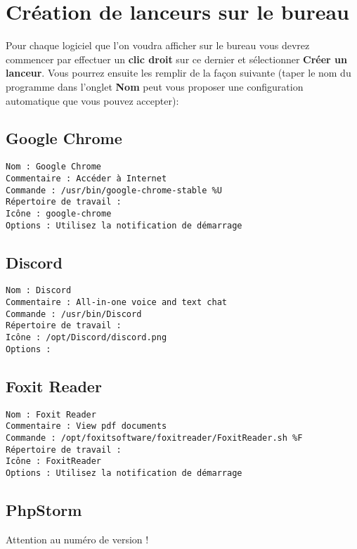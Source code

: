 \section{Création de lanceurs sur le bureau}

Pour chaque logiciel que l'on voudra afficher sur le bureau vous devrez commencer par effectuer un \textbf{clic droit} sur ce dernier et sélectionner \textbf{Créer un lanceur}. Vous pourrez ensuite les remplir de la façon suivante (taper le nom du programme dans l'onglet \textbf{Nom} peut vous proposer une configuration automatique que vous pouvez accepter):

\subsection{Google Chrome}

\begin{lstlisting}[style=tf]
Nom : Google Chrome
Commentaire : Accéder à Internet
Commande : /usr/bin/google-chrome-stable %U
Répertoire de travail :
Icône : google-chrome
Options : Utilisez la notification de démarrage
\end{lstlisting}

\subsection{Discord}

\begin{lstlisting}[style=tf]
Nom : Discord
Commentaire : All-in-one voice and text chat
Commande : /usr/bin/Discord
Répertoire de travail :
Icône : /opt/Discord/discord.png
Options :
\end{lstlisting}

\subsection{Foxit Reader}

\begin{lstlisting}[style=tf]
Nom : Foxit Reader
Commentaire : View pdf documents
Commande : /opt/foxitsoftware/foxitreader/FoxitReader.sh %F
Répertoire de travail :
Icône : FoxitReader
Options : Utilisez la notification de démarrage
\end{lstlisting}

\subsection{PhpStorm}

Attention au numéro de version !

